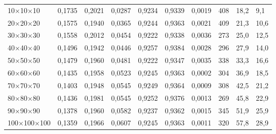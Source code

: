 \begin{tabular}{lrrrrrrlll}
10×10×10 & 0,1735 & 0,2021 & 0,0287 & 0,9234 & 0,9339 & 0,0019 & 408 & 18,2 & 9,1 \\
20×20×20 & 0,1575 & 0,1940 & 0,0365 & 0,9244 & 0,9363 & 0,0021 & 409 & 21,3 & 10,6 \\
30×30×30 & 0,1558 & 0,2012 & 0,0454 & 0,9222 & 0,9338 & 0,0036 & 273 & 25,0 & 12,5 \\
40×40×40 & 0,1496 & 0,1942 & 0,0446 & 0,9257 & 0,9384 & 0,0028 & 296 & 27,9 & 14,0 \\
50×50×50 & 0,1479 & 0,1960 & 0,0481 & 0,9222 & 0,9347 & 0,0035 & 338 & 33,3 & 16,6 \\
60×60×60 & 0,1435 & 0,1958 & 0,0523 & 0,9245 & 0,9363 & 0,0002 & 304 & 36,9 & 18,5 \\
70×70×70 & 0,1403 & 0,1948 & 0,0545 & 0,9249 & 0,9364 & 0,0009 & 308 & 42,5 & 21,2 \\
80×80×80 & 0,1436 & 0,1981 & 0,0545 & 0,9252 & 0,9376 & 0,0013 & 269 & 45,8 & 22,9 \\
90×90×90 & 0,1378 & 0,1960 & 0,0582 & 0,9237 & 0,9362 & 0,0015 & 345 & 51,9 & 25,9 \\
100×100×100 & 0,1359 & 0,1966 & 0,0607 & 0,9245 & 0,9363 & 0,0011 & 320 & 57,8 & 28,9 \\
\bottomrule
\end{tabular}
